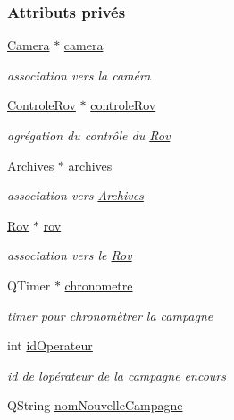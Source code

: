 \subsubsection*{Attributs privés}
\begin{DoxyCompactItemize}
\item 
\hyperlink{class_camera}{Camera} $\ast$ \hyperlink{class_i_h_m_rov_a0eda0e4726269508d4563d98064dca9d}{camera}
\begin{DoxyCompactList}\small\item\em association vers la caméra \end{DoxyCompactList}\item 
\hyperlink{class_controle_rov}{Controle\+Rov} $\ast$ \hyperlink{class_i_h_m_rov_a405b0c05970829fbf297ee0d26af9bca}{controle\+Rov}
\begin{DoxyCompactList}\small\item\em agrégation du contrôle du \hyperlink{class_rov}{Rov} \end{DoxyCompactList}\item 
\hyperlink{class_archives}{Archives} $\ast$ \hyperlink{class_i_h_m_rov_a1e64353d7244219599c46450bb84e1df}{archives}
\begin{DoxyCompactList}\small\item\em association vers \hyperlink{class_archives}{Archives} \end{DoxyCompactList}\item 
\hyperlink{class_rov}{Rov} $\ast$ \hyperlink{class_i_h_m_rov_a777ca33fdb295ba6b6773e880356fa1e}{rov}
\begin{DoxyCompactList}\small\item\em association vers le \hyperlink{class_rov}{Rov} \end{DoxyCompactList}\item 
Q\+Timer $\ast$ \hyperlink{class_i_h_m_rov_ac8733c564d7beea8b669e62544a006a5}{chronometre}
\begin{DoxyCompactList}\small\item\em timer pour chronomètrer la campagne \end{DoxyCompactList}\item 
int \hyperlink{class_i_h_m_rov_a110af5c174e9fbba12bffbe0301ed690}{id\+Operateur}
\begin{DoxyCompactList}\small\item\em id de l\textquotesingle{}opérateur de la campagne encours \end{DoxyCompactList}\item 
Q\+String \hyperlink{class_i_h_m_rov_a72623927157b53a89266026514122030}{nom\+Nouvelle\+Campagne}

\end{DoxyCompactItemize}
